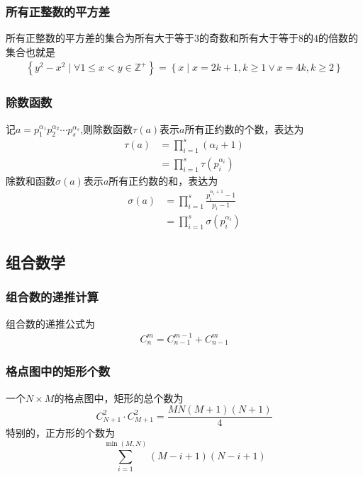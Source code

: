 \documentclass{code}
\begin{document}
\subsubsection{所有正整数的平方差}
所有正整数的平方差的集合为所有大于等于$3$的奇数和所有大于等于$8$的$4$的倍数的集合也就是
\begin{align*}
    \left\{y^2-x^2\mid\forall 1\leqslant x<y\in \mathbb{Z}^+\right\}=\left\{x\mid x=2k+1,k\geqslant 1\vee x=4k,k\geqslant 2\right\}
\end{align*}
\subsubsection{除数函数}
记$\displaystyle a=p_{1}^{\alpha_{1}}p_{2}^{\alpha_{2}}\cdots p_{s}^{\alpha_{s}}$,则除数函数$\tau \left(a\right)$表示$a$所有正约数的个数，表达为\begin{align*}
    \tau \left(a\right) &=\prod_{i=1}^{s}\left(\alpha_{i}+1\right)\\
    &=\prod_{i=1}^{s}\tau \left(p_{i}^{\alpha_{i}}\right)
\end{align*}
除数和函数$\sigma \left(a\right)$表示$a$所有正约数的和，表达为
\begin{align*}
    \sigma \left(a\right) &=\prod_{i=1}^{s}\frac{p_{i}^{\alpha_{i}+1}-1}{p_{i}-1}\\
    &=\prod_{i=1}^{s}\sigma \left(p_{i}^{\alpha_{i}}\right)
\end{align*}
\subsection{组合数学}
\subsubsection{组合数的递推计算}
组合数的递推公式为
\begin{align*}
    C_{n}^{m} = C_{n-1}^{m-1} + C_{n-1}^{m}
\end{align*}
\subsubsection{格点图中的矩形个数}
一个$N\times M$的格点图中，矩形的总个数为
\[
C_{N+1}^{2} \cdot C_{M+1}^{2} = \frac{MN\left(M+1\right)\left(N+1\right)}{4}
\]特别的，正方形的个数为\[
\sum_{i=1}^{\min\left(M,N\right)} \left(M-i+1\right)\left(N-i+1\right)
\]
\end{document}

